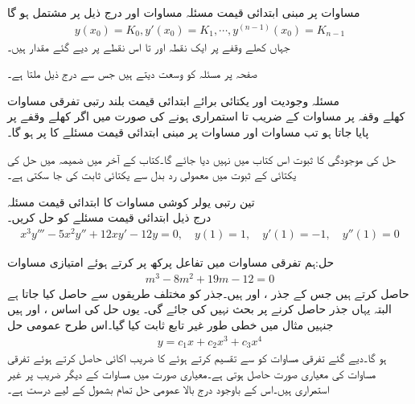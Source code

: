 مساوات  پر مبنی ابتدائی قیمت مسئلہ مساوات  اور درج ذیل   پر مشتمل ہو گا
\begin{align}\label{مساوات_سادہ+بلند_ابتدائی_شرائط}
y(x_0)=K_0, y'(x_0)=K_1,\cdots , y^{(n-1)}(x_0)=K_{n-1}
\end{align}
جہاں  کھلے وقفے  پر ایک نقطہ اور  تا  اس نقطے پر  دیے گئے مقدار ہیں۔

صفحہ  پر مسئلہ  کو وسعت دیتے ہیں جس سے درج ذیل ملتا ہے۔

\quad مسئلہ وجودیت اور یکتائی برائے ابتدائی قیمت بلند رتبی  تفرقی مساوات\\
کھلے وقفہ  پر مساوات  کے  ضریب   تا  استمراری ہونے کی صورت میں اگر  کھلے وقفے پر پایا جاتا ہو تب مساوات  اور مساوات  پر مبنی ابتدائی قیمت مسئلے کا  پر     ہو گا۔

حل کی موجودگی کا ثبوت اس کتاب میں نہیں دیا جائے گا۔کتاب کے آخر میں ضمیمہ  میں  حل کی یکتائی کے ثبوت میں معمولی رد بدل سے یکتائی ثابت کی جا سکتی ہے۔  

\quad تین رتبی یولر کوشی مساوات کا ابتدائی قیمت مسئلہ\\
درج ذیل ابتدائی قیمت مسئلے کو حل کریں۔
\begin{align*}
x^3y'''-5x^2y''+12xy'-12y=0,\quad y(1)=1, \quad y'(1)=-1, \quad y''(1)=0
\end{align*}

حل:ہم تفرقی مساوات میں  تفاعل پرکھ  پر کرتے ہوئے امتیازی مساوات
\begin{align*}
m^3-8m^2+19m-12=0
\end{align*}
حاصل کرتے ہیں جس کے جذر ،  اور  ہیں۔جذر  کو مختلف طریقوں سے حاصل کیا جاتا ہے البتہ یہاں جذر حاصل کرنے پر بحث نہیں کی جائے گی۔ یوں حل کی اساس ،  اور  ہیں جنہیں مثال  میں خطی طور غیر تابع ثابت کیا گیا۔اس طرح عمومی حل
\begin{align*}
y=c_1x+c_2x^3+c_3x^4
\end{align*}
ہو گا۔دیے گئے تفرقی مساوات کو   سے تقسیم کرتے ہوئے  کا  ضریب  اکائی حاصل کرتے ہوئے تفرقی مساوات کی معیاری صورت حاصل ہوتی ہے۔معیاری صورت میں مساوات کے دیگر  ضریب   پر غیر استمراری ہیں۔اس کے باوجود درج بالا عمومی حل تمام  بشمول   کے لیے درست ہے۔ 


